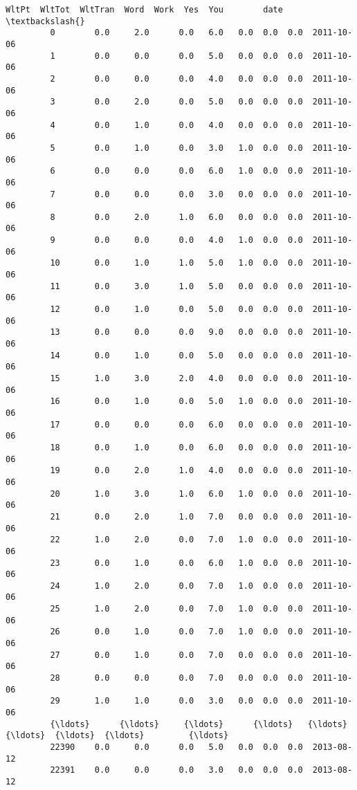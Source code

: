\documentclass[11pt]{article}
\begin{document}
\begin{Verbatim}[commandchars=\\\{\}]
                WltPt  WltTot  WltTran  Word  Work  Yes  You        date  \textbackslash{}
         0        0.0     2.0      0.0   6.0   0.0  0.0  0.0  2011-10-06   
         1        0.0     0.0      0.0   5.0   0.0  0.0  0.0  2011-10-06   
         2        0.0     0.0      0.0   4.0   0.0  0.0  0.0  2011-10-06   
         3        0.0     2.0      0.0   5.0   0.0  0.0  0.0  2011-10-06   
         4        0.0     1.0      0.0   4.0   0.0  0.0  0.0  2011-10-06   
         5        0.0     1.0      0.0   3.0   1.0  0.0  0.0  2011-10-06   
         6        0.0     0.0      0.0   6.0   1.0  0.0  0.0  2011-10-06   
         7        0.0     0.0      0.0   3.0   0.0  0.0  0.0  2011-10-06   
         8        0.0     2.0      1.0   6.0   0.0  0.0  0.0  2011-10-06   
         9        0.0     0.0      0.0   4.0   1.0  0.0  0.0  2011-10-06   
         10       0.0     1.0      1.0   5.0   1.0  0.0  0.0  2011-10-06   
         11       0.0     3.0      1.0   5.0   0.0  0.0  0.0  2011-10-06   
         12       0.0     1.0      0.0   5.0   0.0  0.0  0.0  2011-10-06   
         13       0.0     0.0      0.0   9.0   0.0  0.0  0.0  2011-10-06   
         14       0.0     1.0      0.0   5.0   0.0  0.0  0.0  2011-10-06   
         15       1.0     3.0      2.0   4.0   0.0  0.0  0.0  2011-10-06   
         16       0.0     1.0      0.0   5.0   1.0  0.0  0.0  2011-10-06   
         17       0.0     0.0      0.0   6.0   0.0  0.0  0.0  2011-10-06   
         18       0.0     1.0      0.0   6.0   0.0  0.0  0.0  2011-10-06   
         19       0.0     2.0      1.0   4.0   0.0  0.0  0.0  2011-10-06   
         20       1.0     3.0      1.0   6.0   1.0  0.0  0.0  2011-10-06   
         21       0.0     2.0      1.0   7.0   0.0  0.0  0.0  2011-10-06   
         22       1.0     2.0      0.0   7.0   1.0  0.0  0.0  2011-10-06   
         23       0.0     1.0      0.0   6.0   1.0  0.0  0.0  2011-10-06   
         24       1.0     2.0      0.0   7.0   1.0  0.0  0.0  2011-10-06   
         25       1.0     2.0      0.0   7.0   1.0  0.0  0.0  2011-10-06   
         26       0.0     1.0      0.0   7.0   1.0  0.0  0.0  2011-10-06   
         27       0.0     1.0      0.0   7.0   0.0  0.0  0.0  2011-10-06   
         28       0.0     0.0      0.0   7.0   0.0  0.0  0.0  2011-10-06   
         29       1.0     1.0      0.0   3.0   0.0  0.0  0.0  2011-10-06   
         {\ldots}      {\ldots}     {\ldots}      {\ldots}   {\ldots}   {\ldots}  {\ldots}  {\ldots}         {\ldots}   
         22390    0.0     0.0      0.0   5.0   0.0  0.0  0.0  2013-08-12   
         22391    0.0     0.0      0.0   3.0   0.0  0.0  0.0  2013-08-12   

\end{Verbatim}
\end{document}
